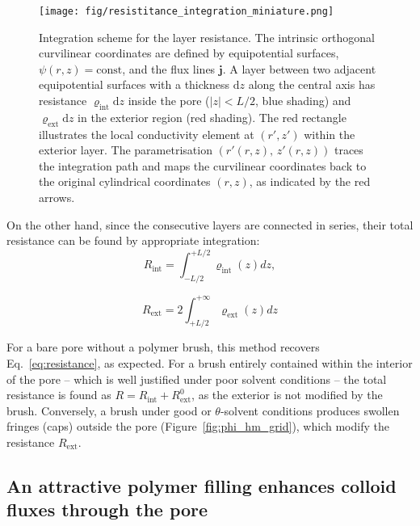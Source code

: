 \documentclass[12pt, a4paper]{article}
\begin{document}
\begin{figure}
    \centering
    \texttt{[image: fig/resistitance\_integration\_miniature.png]}
    \caption{%
    Integration scheme for the layer resistance.  
    The intrinsic orthogonal curvilinear coordinates are defined by equipotential surfaces, $\psi(r,z)=\text{const}$, and the flux lines $\mathbf{j}$.  
    A layer between two adjacent equipotential surfaces with a thickness $\text{d}z$ along the central axis has resistance $\varrho_{\text{int}}\text{d}z$ inside the pore ($|z|<L/2$, blue shading) and $\varrho_{\text{ext}}\text{d}z$ in the exterior region (red shading).  
    The red rectangle illustrates the local conductivity element at $(r',z')$ within the exterior layer.  
    The parametrisation $(r'(r,z),\,z'(r,z))$ traces the integration path and maps the curvilinear coordinates back to the original cylindrical coordinates $(r,z)$, as indicated by the red arrows.%
    }
    \label{fig:integration_scheme}
\end{figure}

On the other hand, since the consecutive layers are connected in series, their total resistance can be found by appropriate integration:
\begin{equation}
    R_{\text{int}} = \int_{-L/2}^{+L/2}\varrho_{\text{int}}(z) dz,
    \label{R_int}
\end{equation}

\begin{equation}
   R_{\text{ext}} =2\int_{+L/2}^{+\infty}\varrho_{\text{ext}}(z)dz
    \label{R_ext}
\end{equation}

For a bare pore without a polymer brush, this method recovers Eq.~\ref{eq:resistance}, as expected.
For a brush entirely contained within the interior of the pore -- which is well justified under poor solvent conditions -- the total resistance is found as $R = R_{\text{int}} + R_{\text{ext}}^{0}$, as the exterior is not modified by the brush.
Conversely, a brush under good or $\theta$-solvent conditions produces swollen fringes (caps) outside the pore (Figure~\ref{fig:phi_hm_grid}), which modify the resistance $R_{\text{ext}}$.


\subsection{An attractive polymer filling enhances colloid fluxes through the pore}
\end{document}
